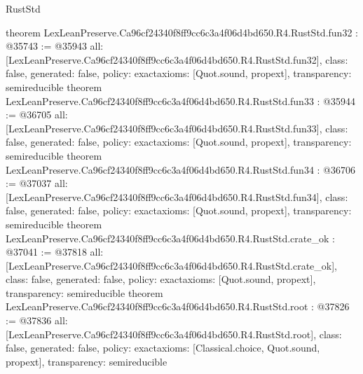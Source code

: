 \begin{lexlean}{RustStd}
\begin{coremodule}
{}
theorem LexLeanPreserve.Ca96cf24340f8ff9cc6c3a4f06d4bd650.R4.RustStd.fun32 : @35743 := @35943 {
  all: [LexLeanPreserve.Ca96cf24340f8ff9cc6c3a4f06d4bd650.R4.RustStd.fun32],
  class: false,
  generated: false,
  policy: exact{axioms: [Quot.sound, propext]},
  transparency: semireducible
}
theorem LexLeanPreserve.Ca96cf24340f8ff9cc6c3a4f06d4bd650.R4.RustStd.fun33 : @35944 := @36705 {
  all: [LexLeanPreserve.Ca96cf24340f8ff9cc6c3a4f06d4bd650.R4.RustStd.fun33],
  class: false,
  generated: false,
  policy: exact{axioms: [Quot.sound, propext]},
  transparency: semireducible
}
theorem LexLeanPreserve.Ca96cf24340f8ff9cc6c3a4f06d4bd650.R4.RustStd.fun34 : @36706 := @37037 {
  all: [LexLeanPreserve.Ca96cf24340f8ff9cc6c3a4f06d4bd650.R4.RustStd.fun34],
  class: false,
  generated: false,
  policy: exact{axioms: [Quot.sound, propext]},
  transparency: semireducible
}
theorem LexLeanPreserve.Ca96cf24340f8ff9cc6c3a4f06d4bd650.R4.RustStd.crate_ok : @37041 := @37818 {
  all: [LexLeanPreserve.Ca96cf24340f8ff9cc6c3a4f06d4bd650.R4.RustStd.crate_ok],
  class: false,
  generated: false,
  policy: exact{axioms: [Quot.sound, propext]},
  transparency: semireducible
}
theorem LexLeanPreserve.Ca96cf24340f8ff9cc6c3a4f06d4bd650.R4.RustStd.root : @37826 := @37836 {
  all: [LexLeanPreserve.Ca96cf24340f8ff9cc6c3a4f06d4bd650.R4.RustStd.root],
  class: false,
  generated: false,
  policy: exact{axioms: [Classical.choice, Quot.sound, propext]},
  transparency: semireducible
}


\end{coremodule}
\end{lexlean}
